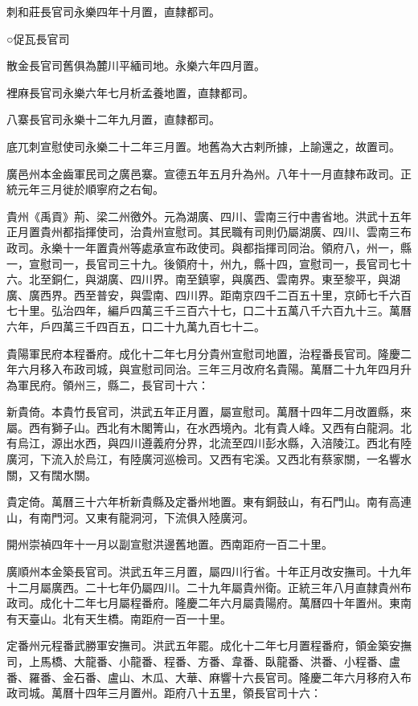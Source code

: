 刺和莊長官司永樂四年十月置，直隸都司。

○促瓦長官司

散金長官司舊俱為麓川平緬司地。永樂六年四月置。

裡麻長官司永樂六年七月析孟養地置，直隸都司。

八寨長官司永樂十二年九月置，直隸都司。

底兀刺宣慰使司永樂二十二年三月置。地舊為大古剌所據，上諭還之，故置司。

廣邑州本金齒軍民司之廣邑寨。宣德五年五月升為州。八年十一月直隸布政司。正統元年三月徙於順寧府之右甸。

貴州《禹貢》荊、梁二州徼外。元為湖廣、四川、雲南三行中書省地。洪武十五年正月置貴州都指揮使司，治貴州宣慰司。其民職有司則仍屬湖廣、四川、雲南三布政司。永樂十一年置貴州等處承宣布政使司。與都指揮司同治。領府八，州一，縣一，宣慰司一，長官司三十九。後領府十，州九，縣十四，宣慰司一，長官司七十六。北至銅仁，與湖廣、四川界。南至鎮寧，與廣西、雲南界。東至黎平，與湖廣、廣西界。西至普安，與雲南、四川界。距南京四千二百五十里，京師七千六百七十里。弘治四年，編戶四萬三千三百六十七，口二十五萬八千六百九十三。萬曆六年，戶四萬三千四百五，口二十九萬九百七十二。

貴陽軍民府本程番府。成化十二年七月分貴州宣慰司地置，治程番長官司。隆慶二年六月移入布政司城，與宣慰司同治。三年三月改府名貴陽。萬曆二十九年四月升為軍民府。領州三，縣二，長官司十六：

新貴倚。本貴竹長官司，洪武五年正月置，屬宣慰司。萬曆十四年二月改置縣，來屬。西有獅子山。西北有木閣箐山，在水西境內。北有貴人峰。又西有白龍洞。北有烏江，源出水西，與四川遵義府分界，北流至四川彭水縣，入涪陵江。西北有陸廣河，下流入於烏江，有陸廣河巡檢司。又西有宅溪。又西北有蔡家關，一名響水關，又有闊水關。

貴定倚。萬曆三十六年析新貴縣及定番州地置。東有銅鼓山，有石門山。南有高連山，有南門河。又東有龍洞河，下流俱入陸廣河。

開州崇禎四年十一月以副宣慰洪邊舊地置。西南距府一百二十里。

廣順州本金築長官司。洪武五年三月置，屬四川行省。十年正月改安撫司。十九年十二月屬廣西。二十七年仍屬四川。二十九年屬貴州衛。正統三年八月直隸貴州布政司。成化十二年七月屬程番府。隆慶二年六月屬貴陽府。萬曆四十年置州。東南有天臺山。北有天生橋。南距府一百一十里。

定番州元程番武勝軍安撫司。洪武五年罷。成化十二年七月置程番府，領金築安撫司，上馬橋、大龍番、小龍番、程番、方番、韋番、臥龍番、洪番、小程番、盧番、羅番、金石番、盧山、木瓜、大華、麻響十六長官司。隆慶二年六月移府入布政司城。萬曆十四年三月置州。距府八十五里，領長官司十六：

